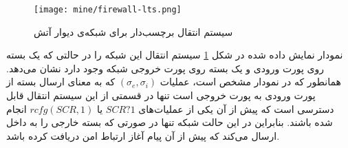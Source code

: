 \begin{figure}[ht]
    \centerline{\texttt{[image: mine/firewall-lts.png]}}
    \caption{سیستم انتقال برچسب‌دار برای شبکه‌ی دیوار آتش}
    \label{firewall:lts}
\end{figure}
نمودار نمایش داده شده در شکل
\ref{firewall:lts}
سیستم انتقال این شبکه‌ را در حالتی که یک بسته روی پورت ورودی و یک بسته روی پورت خروجی شبکه وجود دارد نشان می‌دهد.
همانطور که در نمودار مشخص است، عملیات
$(\sigma_e,\sigma_i)$
که به معنای ارسال بسته از پورت ورودی به پورت خروجی است تنها در قسمتی از این سیستم انتقال قابل دسترسی است که پیش از آن یکی از عملیات‌های
$SCR?1$
یا
$rcfg(SCR,1)$
انجام شده باشند.
بنابراین در این حالت شبکه تنها در صورتی که بسته خارجی را به داخل ارسال می‌کند که پیش از آن پیام آغاز ارتباط امن دریافت کرده‌ باشد.

